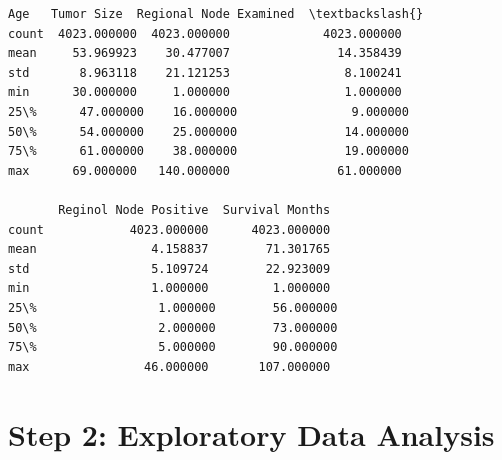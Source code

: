 \documentclass[11pt]{article}
\makeatletter
\newcommand{\boxspacing}{\kern\kvtcb@left@rule\kern\kvtcb@boxsep}
\newcommand{\prompt}[4]{
        {\ttfamily\llap{{\color{#2}[#3]:\hspace{3pt}#4}}\vspace{-\baselineskip}}
    }
\makeatother
\begin{document}
            \begin{tcolorbox}[breakable, size=fbox, boxrule=.5pt, pad at break*=1mm, opacityfill=0]
\prompt{Out}{outcolor}{8}{\boxspacing}
\begin{Verbatim}[commandchars=\\\{\}]
               Age   Tumor Size  Regional Node Examined  \textbackslash{}
count  4023.000000  4023.000000             4023.000000
mean     53.969923    30.477007               14.358439
std       8.963118    21.121253                8.100241
min      30.000000     1.000000                1.000000
25\%      47.000000    16.000000                9.000000
50\%      54.000000    25.000000               14.000000
75\%      61.000000    38.000000               19.000000
max      69.000000   140.000000               61.000000

       Reginol Node Positive  Survival Months
count            4023.000000      4023.000000
mean                4.158837        71.301765
std                 5.109724        22.923009
min                 1.000000         1.000000
25\%                 1.000000        56.000000
50\%                 2.000000        73.000000
75\%                 5.000000        90.000000
max                46.000000       107.000000
\end{Verbatim}
\end{tcolorbox}
        
    \section{Step 2: Exploratory Data
Analysis}\label{step-2-exploratory-data-analysis}
\end{document}
